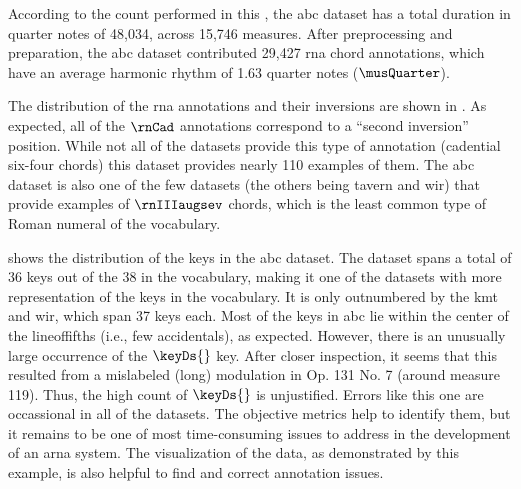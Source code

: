 
According to the count performed in this \thesisdiss{}, the
\gls{abc} dataset has a total duration in quarter notes of
48,034, across 15,746 measures. After preprocessing and
preparation, the \gls{abc} dataset contributed 29,427
\gls{rna} chord annotations, which have an average harmonic
rhythm of 1.63 quarter notes ($\musQuarter$).

The distribution of the \gls{rna} annotations and their
inversions are shown in . As
expected, all of the $\rnCad$ annotations correspond to a
``second inversion'' position. While not all of the datasets
provide this type of annotation (cadential six-four chords)
this dataset provides nearly 110 examples of them. The
\gls{abc} dataset is also one of the few datasets (the
others being \gls{tavern} and \gls{wir}) that provide
examples of $\rnIIIaugsev$ chords, which is the least common
type of Roman numeral of the vocabulary.



 shows the distribution of the keys
in the \gls{abc} dataset. The dataset spans a total of 36
keys out of the 38 in the vocabulary, making it one of the
datasets with more representation of the keys in the
vocabulary. It is only outnumbered by the \gls{kmt} and
\gls{wir}, which span 37 keys each. Most of the keys in
\gls{abc} lie within the center of the \gls{lineoffifths}
(i.e., few accidentals), as expected. However, there is an
unusually large occurrence of the $\keyDs{}$ key. After closer
inspection, it seems that this resulted from a mislabeled
(long) modulation in Op. 131 No. 7 (around measure 119).
Thus, the high count of $\keyDs{}$ is unjustified. Errors like
this one are occassional in all of the datasets. The
objective metrics help to identify them, but it remains to
be one of most time-consuming issues to address in the
development of an \gls{arna} system. The visualization of
the data, as demonstrated by this example, is also helpful
to find and correct annotation issues.


